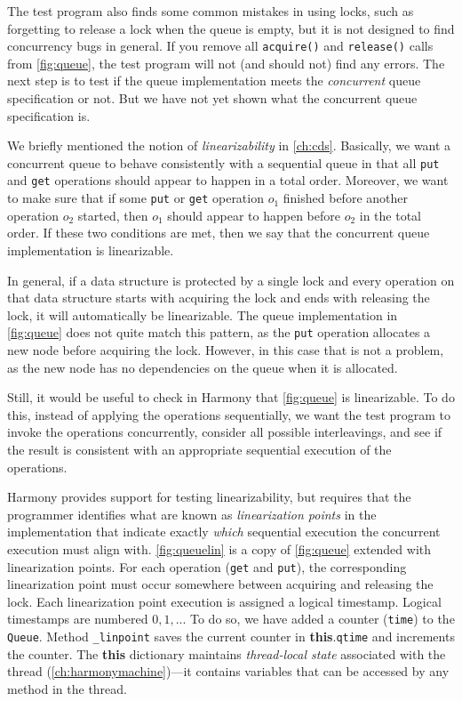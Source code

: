 \documentclass{report}
\begin{document}
The test program also finds some common mistakes in using
locks, such as forgetting to release a lock when the queue
is empty, but it is not designed to find concurrency bugs
in general.  If you remove all \texttt{acquire()} and
\texttt{release()} calls from \autoref{fig:queue},
the test program will not (and should not)
find any errors.
The next step is to test if the queue implementation
meets the \emph{concurrent} queue specification or not.
But we have not yet shown what the
concurrent queue specification is.

We briefly mentioned the notion of \emph{linearizability}
in \autoref{ch:cds}.
Basically, we want a concurrent queue to behave
consistently with a sequential queue in that all
\texttt{put}
and \texttt{get} operations should appear to happen
in a total order.
Moreover, we want to make sure that if some
\texttt{put} or \texttt{get} operation $o_1$ finished
before another operation $o_2$ started, then $o_1$
should appear to happen before $o_2$ in the total order.
If these two conditions are met, then we say that
the concurrent queue implementation is linearizable.

In general, if a data structure is protected by
a single lock and every operation on that data
structure starts with acquiring the lock and ends
with releasing the lock, it will automatically be
linearizable.
The queue implementation in \autoref{fig:queue} does
not quite match this pattern, as the \texttt{put}
operation allocates a new node before acquiring
the lock.
However, in this case that is not a problem, as
the new node has no dependencies on the queue
when it is allocated.

Still, it would be useful to check in Harmony that
\autoref{fig:queue} is linearizable.
To do this, instead of applying the operations sequentially,
we want the test program to invoke the operations concurrently,
consider all possible interleavings, and see if the result
is consistent with an appropriate sequential execution of the
operations.

%
Harmony provides support for testing linearizability,
but requires that the programmer
identifies what are known as \emph{linearization points}
in the implementation that indicate exactly \emph{which} sequential
execution the concurrent execution must align with.
\autoref{fig:queuelin} is a copy of \autoref{fig:queue} extended with
linearization points.
For each operation (\texttt{get} and \texttt{put}), the corresponding
linearization point must occur somewhere between acquiring and releasing
the lock.
%
Each linearization point execution is assigned a logical timestamp.
Logical timestamps are numbered $0, 1, ...$
To do so, we have added a counter (\texttt{time}) to the \texttt{Queue}.
Method \texttt{\_linpoint} saves the current counter in
\textbf{this}.\texttt{qtime} and increments the counter.
The \textbf{this} dictionary maintains \emph{thread-local state} associated
with the thread (\autoref{ch:harmonymachine})---it contains variables that
can be accessed by any method in the thread.
\end{document}
